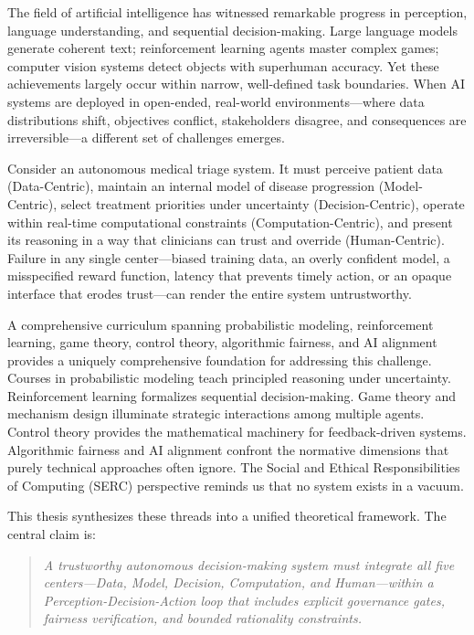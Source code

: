 \documentclass[11pt,a4paper]{article}
\begin{document}
The field of artificial intelligence has witnessed remarkable progress in perception, language understanding, and sequential decision-making. Large language models generate coherent text; reinforcement learning agents master complex games; computer vision systems detect objects with superhuman accuracy. Yet these achievements largely occur within narrow, well-defined task boundaries. When AI systems are deployed in open-ended, real-world environments---where data distributions shift, objectives conflict, stakeholders disagree, and consequences are irreversible---a different set of challenges emerges.

Consider an autonomous medical triage system. It must perceive patient data (Data-Centric), maintain an internal model of disease progression (Model-Centric), select treatment priorities under uncertainty (Decision-Centric), operate within real-time computational constraints (Computation-Centric), and present its reasoning in a way that clinicians can trust and override (Human-Centric). Failure in any single center---biased training data, an overly confident model, a misspecified reward function, latency that prevents timely action, or an opaque interface that erodes trust---can render the entire system untrustworthy.

A comprehensive curriculum spanning probabilistic modeling, reinforcement learning, game theory, control theory, algorithmic fairness, and AI alignment provides a uniquely comprehensive foundation for addressing this challenge. Courses in probabilistic modeling teach principled reasoning under uncertainty. Reinforcement learning formalizes sequential decision-making. Game theory and mechanism design illuminate strategic interactions among multiple agents. Control theory provides the mathematical machinery for feedback-driven systems. Algorithmic fairness and AI alignment confront the normative dimensions that purely technical approaches often ignore. The Social and Ethical Responsibilities of Computing (SERC) perspective reminds us that no system exists in a vacuum.

This thesis synthesizes these threads into a unified theoretical framework. The central claim is:

\begin{quote}
\emph{A trustworthy autonomous decision-making system must integrate all five centers---Data, Model, Decision, Computation, and Human---within a Perception-Decision-Action loop that includes explicit governance gates, fairness verification, and bounded rationality constraints.}
\end{quote}
\end{document}
